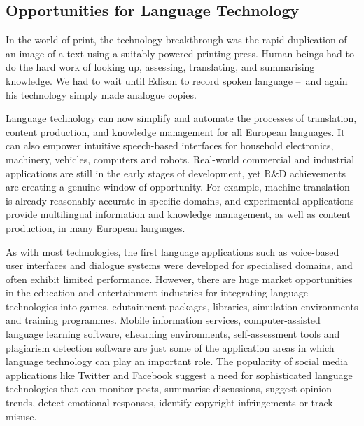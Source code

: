 \documentclass[]{../../metanetpaper}
\begin{document}
\begin{multicols}{2}
\subsection{Opportunities for Language Technology}

In the world of print, the technology breakthrough was the rapid duplication of an image of a text using a suitably powered printing press. Human beings had to do the hard work of looking up, assessing, translating, and summarising knowledge. We had to wait until Edison to record spoken language --~and again his technology simply made analogue copies.

Language technology can now simplify and automate the processes of translation, content production, and knowledge management for all European languages. It can also empower intuitive speech-based interfaces for household electronics, machinery, vehicles, computers and robots. Real-world commercial and industrial applications are still in the early stages of development, yet R\&D achievements are creating a genuine window of opportunity. For example, machine translation is already reasonably accurate in specific domains, and experimental applications provide multilingual information and knowledge management, as well as content production, in many European languages. 

As with most technologies, the first language applications such as voice-based user interfaces and dialogue systems were developed for specialised domains, and often exhibit limited performance. However, there are huge market opportunities in the education and entertainment industries for integrating language technologies into games, edutainment packages, libraries, simulation environments and training programmes. Mobile information services, computer-assisted language learning software, eLearning environments, self-assessment tools and plagiarism detection software are just some of the application areas in which language technology can play an important role. The popularity of social media applications like Twitter and Facebook suggest a need for sophisticated language technologies that can monitor posts, summarise discussions, suggest opinion trends, detect emotional responses, identify copyright infringements or track misuse.



\end{multicols}
\end{document}
